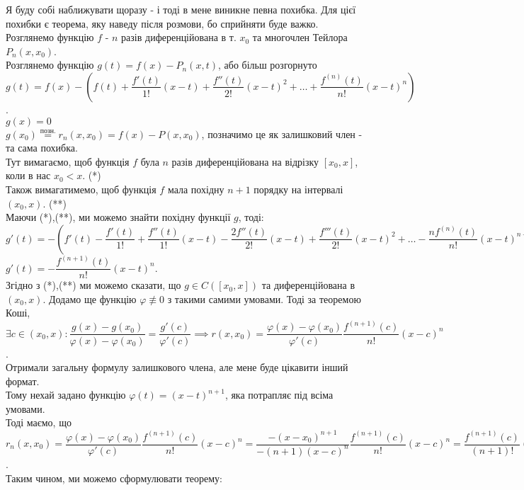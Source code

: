 \documentclass[a4paper, 14pt]{article}
\theoremstyle{theoremdd}
\theoremstyle{theoremdd}
\theoremstyle{theoremdd}
\theoremstyle{theoremdd}
\theoremstyle{theoremdd}
\theoremstyle{theoremdd}
\theoremstyle{theoremdd}
\theoremstyle{theoremdd}
\begin{document}
Я буду собі наближувати щоразу - і тоді в мене виникне певна похибка. Для цієї похибки є теорема, яку наведу після розмови, бо сприйняти буде важко.
\bigskip \\
Розглянемо функцію $f$ - $n$ разів диференційована в т. $x_0$ та многочлен Тейлора $P_n(x,x_0)$.\\
Розглянемо функцію $g(t) = f(x) - P_n(x,t)$, або більш розгорнуто \\ 
$g(t) = f(x) - \left( f(t) + \dfrac{f'(t)}{1!}(x-t) + \dfrac{f''(t)}{2!}(x-t)^2 + \dots + \dfrac{f^{(n)}(t)}{n!}(x-t)^n \right)$.\\
$g(x) = 0$\\
$g(x_0) \overset{\text{позн.}}{=} r_n(x,x_0) = f(x) - P(x,x_0)$, позначимо це як залишковий член - та сама похибка.\\
Тут вимагаємо, щоб функція $f$ була $n$ разів диференційована на відрізку $[x_0,x]$, коли в нас $x_0 < x$. (*) \\
Також вимагатимемо, щоб функція $f$ мала похідну $n+1$ порядку на інтервалі $(x_0,x)$. (**)\\
Маючи (*),(**), ми можемо знайти похідну функції $g$, тоді:\\
$g'(t) = - \left(f'(t) - \dfrac{f'(t)}{1!} + \dfrac{f''(t)}{1!}(x-t) - \dfrac{2f''(t)}{2!}(x-t) + \dfrac{f'''(t)}{2!}(x-t)^2 + \dots - \dfrac{n f^{(n)}(t)}{n!}(x-t)^{n-1} + \dfrac{f^{(n+1)}(t)}{n!}(x-t)^n \right)$\\
$g'(t) = -\dfrac{f^{(n+1)}(t)}{n!}(x-t)^n$.\\
Згідно з (*),(**) ми можемо сказати, що $g \in C([x_0,x])$ та диференційована в $(x_0,x)$. Додамо ще функцію $\varphi \not\equiv 0$ з такими самими умовами. Тоді за теоремою Коші,\\
$\exists c \in (x_0,x): \dfrac{g(x)-g(x_0)}{\varphi(x)-\varphi(x_0)} = \dfrac{g'(c)}{\varphi'(c)} \implies r(x,x_0) = \dfrac{\varphi(x)-\varphi(x_0)}{\varphi'(c)} \dfrac{f^{(n+1)}(c)}{n!}(x-c)^n$.\\
Отримали загальну формулу залишкового члена, але мене буде цікавити інший формат.\\
Тому нехай задано функцію $\varphi(t) = (x-t)^{n+1}$, яка потрапляє під всіма умовами.\\
Тоді маємо, що \\ $r_n(x,x_0) = \dfrac{\varphi(x) - \varphi(x_0)}{\varphi'(c)} \dfrac{f^{(n+1)}(c)}{n!}(x-c)^n = \dfrac{-(x-x_0)^{n+1}}{-(n+1)(x-c)^{n}} \dfrac{f^{(n+1)}(c)}{n!}(x-c)^n = \dfrac{f^{(n+1)}(c)}{(n+1)!}(x-x_0)^{n+1}$.\\
Таким чином, ми можемо сформулювати теорему:
\end{document}
